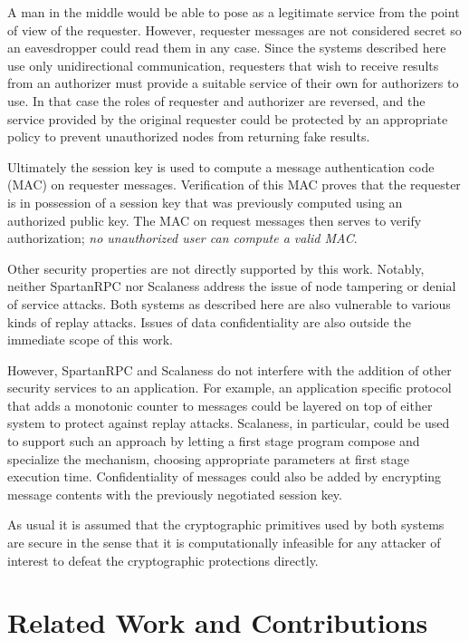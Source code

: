 A man in the middle would be able to pose as a legitimate service from the point of view of the
requester. However, requester messages are not considered secret so an eavesdropper could read
them in any case. Since the systems described here use only unidirectional communication,
requesters that wish to receive results from an authorizer must provide a suitable service of
their own for authorizers to use. In that case the roles of requester and authorizer are
reversed, and the service provided by the original requester could be protected by an
appropriate policy to prevent unauthorized nodes from returning fake results.

Ultimately the session key is used to compute a message authentication code (MAC) on requester
messages. Verification of this MAC proves that the requester is in possession of a session key
that was previously computed using an authorized public key. The MAC on request messages then
serves to verify authorization; \emph{no unauthorized user can compute a valid MAC}.

Other security properties are not directly supported by this work. Notably, neither SpartanRPC
nor Scalaness address the issue of node tampering or denial of service attacks. Both systems as
described here are also vulnerable to various kinds of replay attacks. Issues of data
confidentiality are also outside the immediate scope of this work.

However, SpartanRPC and Scalaness do not interfere with the addition of other security services
to an application. For example, an application specific protocol that adds a monotonic counter
to messages could be layered on top of either system to protect against replay attacks.
Scalaness, in particular, could be used to support such an approach by letting a first stage
program compose and specialize the mechanism, choosing appropriate parameters at first stage
execution time. Confidentiality of messages could also be added by encrypting message contents
with the previously negotiated session key.

As usual it is assumed that the cryptographic primitives used by both systems are secure in the
sense that it is computationally infeasible for any attacker of interest to defeat the
cryptographic protections directly.

\section{Related Work and Contributions}

